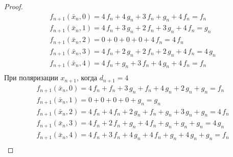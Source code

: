\documentclass[bibliography=totoc, a4paper, 14pt]{extarticle}
\begin{document}
\begin{proof}
$$\begin{array}{l}
f_{n+1}(\bar{x}_n, 0) = 4\,f_n + 4\,g_n + 3\,f_n + g_n + 4\,f_n = f_n \\
f_{n+1}(\bar{x}_n, 1) = 4\,f_n + 3\,g_n + 2\,f_n + 3\,g_n + 4\,f_n = g_n \\
f_{n+1}(\bar{x}_n, 2) = 0 + 0 + 0 + 0 + 4\,f_n = 4\,f_n \\
f_{n+1}(\bar{x}_n, 3) = 4\,f_n + 2\,g_n + 2\,f_n + 2\,g_n + 4\,f_n = 4\,g_n \\
f_{n+1}(\bar{x}_n, 4) = 4\,f_n + g_n + 3\,f_n + 4\,g_n + 4\,f_n = f_n \\
\end{array}$$
При поляризации $x_{n+1}$, когда $d_{n+1} = 4$
$$\begin{array}{l}
f_{n+1}(\bar{x}_n, 0) = 4\,f_n + f_n + 3\,g_n + f_n + 4\,g_n + 2\,g_n + g_n = f_n \\
f_{n+1}(\bar{x}_n, 1) = 0 + 0 + 0 + 0 + g_n = g_n \\
f_{n+1}(\bar{x}_n, 2) = 4\,f_n + 4\,f_n + 2\,g_n + f_n + g_n + 3\,g_n + g_n = 4\,f_n \\
f_{n+1}(\bar{x}_n, 3) = 4\,f_n + 2\,f_n + g_n + 4\,f_n + g_n + g_n + g_n = 4\,g_n \\
f_{n+1}(\bar{x}_n, 4) = 4\,f_n + 3\,f_n + 4\,g_n + 4\,f_n + g_n + 4\,g_n + g_n = f_n \\
\end{array}$$

\end{proof}
\end{document}
